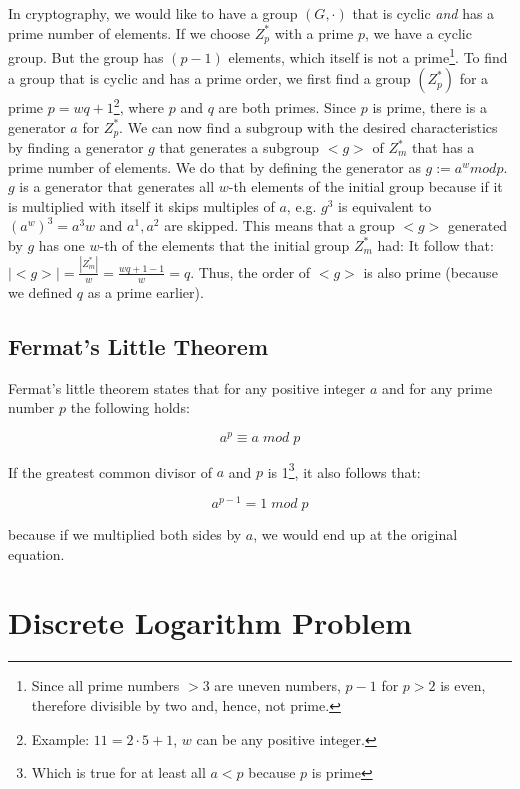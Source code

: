 In cryptography, we would like to have a group $(G, \cdot)$ that is cyclic \emph{and} has a prime number of elements.
If we choose $Z_p^*$ with a prime $p$, we have a cyclic group. But the group has $(p-1)$ elements, which itself is not a prime\footnote{Since all prime numbers $>3$ are uneven numbers, $p-1$ for $p>2$ is even, therefore divisible by two and, hence, not prime.}.
To find a group that is cyclic and has a prime order, we first find a group $(Z_p^*)$ for a prime $p = wq + 1$\footnote{Example: $11 = 2 \cdot 5 + 1$, $w$ can be any positive integer.}, where $p$ and $q$ are both primes.
Since $p$ is prime, there is a generator $a$ for $Z_p^*$.
We can now find a subgroup with the desired characteristics by finding a generator $g$ that generates a subgroup $<g>$ of $Z_m^*$ that has a prime number of elements.
We do that by defining the generator as $g := a^w mod p$.
$g$ is a generator that generates all $w$-th elements of the initial group because if it is multiplied with itself it skips multiples of $a$, e.g. $g^3$ is equivalent to $(a^w)^3 = a^3w$ and $a^1,a^2$ are skipped.
This means that a group $<g>$ generated by $g$ has one $w$-th of the elements that the initial group $Z_m^*$ had:
It follow that: $|<g>| = \frac{|Z_m^*|}{w} = \frac{wq + 1 - 1}{w} = q$.
Thus, the order of $<g>$ is also prime (because we defined $q$ as a prime earlier).

\subsection{Fermat's Little Theorem}\label{sec:little_fermat}

Fermat's little theorem states that for any positive integer $a$ and for any prime number $p$ the following holds:

$$
    a^p \equiv a \; mod \; p
$$

If the greatest common divisor of $a$ and $p$ is 1\footnote{Which is true for at least all $a < p$ because $p$ is prime}, it also follows that:

$$
    a^{p-1} = 1 \; mod \; p
$$

because if we multiplied both sides by $a$, we would end up at the original equation.

\section{Discrete Logarithm Problem}\label{sec:discrete_log}

